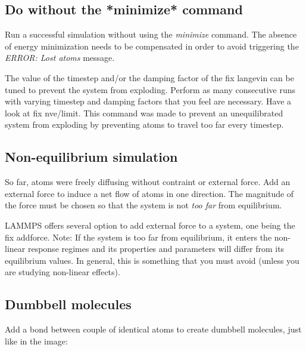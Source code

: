 \noindent \subsection{Do without the *minimize* command}

Run a successful simulation without using the \textit{minimize} command.
The absence of energy minimization needs to be compensated
in order to avoid triggering the \textit{ERROR: Lost atoms} message.

\begin{tcolorbox}[colback=mylightblue!5!white,colframe=mylightblue!75!black,title=Hints]
The value of the timestep and/or the damping factor of the fix langevin
can be tuned to prevent the system from exploding.
Perform as many consecutive runs with varying timestep and damping
factors that you feel are necessary.
Have a look at fix nve/limit. This command was
made to prevent an unequilibrated system from exploding
by preventing atoms to travel too far every timestep.
\end{tcolorbox}

\noindent \subsection{Non-equilibrium simulation}

So far, atoms were freely diffusing without contraint or external force.
Add an external force to induce a net flow of atoms in one
direction. The magnitude of the force must be chosen so
that the system is not \textit{too far} from equilibrium.

\begin{tcolorbox}[colback=mylightblue!5!white,colframe=mylightblue!75!black,title=Hints]
LAMMPS offers several option to add external force to a system, one 
being the fix addforce.
Note: If the system is too far from equilibrium, it enters the non-linear response 
regimes and its properties and parameters will differ from its equilibrium values.
In general, this is something that you must avoid (unless you are studying
non-linear effects). 
\end{tcolorbox}

\noindent \subsection{Dumbbell molecules}

Add a bond between couple of identical atoms to create
dumbbell molecules, just like in the image:

